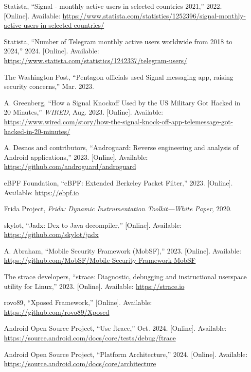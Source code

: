 \documentclass[a4paper,12pt]{report}
\begin{document}
\begin{thebibliography}{99}
Statista, “Signal - monthly active users in selected countries 2021,” 2022. [Online]. Available: \url{https://www.statista.com/statistics/1252396/signal-monthly-active-users-in-selected-countries/}

Statista, “Number of Telegram monthly active users worldwide from 2018 to 2024,” 2024. [Online]. Available: \url{https://www.statista.com/statistics/1242337/telegram-users/}

The Washington Post, “Pentagon officials used Signal messaging app, raising security concerns,” Mar. 2023.

A. Greenberg, “How a Signal Knockoff Used by the US Military Got Hacked in 20 Minutes,” \emph{WIRED}, Aug. 2023. [Online]. Available: \url{https://www.wired.com/story/how-the-signal-knock-off-app-telemessage-got-hacked-in-20-minutes/}

A. Desnos and contributors, “Androguard: Reverse engineering and analysis of Android applications,” 2023. [Online]. Available: \url{https://github.com/androguard/androguard}

eBPF Foundation, “eBPF: Extended Berkeley Packet Filter,” 2023. [Online]. Available: \url{https://ebpf.io}

Frida Project, \emph{Frida: Dynamic Instrumentation Toolkit—White Paper}, 2020.

skylot, “Jadx: Dex to Java decompiler,” [Online]. Available: \url{https://github.com/skylot/jadx}

A. Abraham, “Mobile Security Framework (MobSF),” 2023. [Online]. Available: \url{https://github.com/MobSF/Mobile-Security-Framework-MobSF}

The strace developers, “strace: Diagnostic, debugging and instructional userspace utility for Linux,” 2023. [Online]. Available: \url{https://strace.io}

rovo89, “Xposed Framework,” [Online]. Available: \url{https://github.com/rovo89/Xposed}

Android Open Source Project, “Use ftrace,” Oct. 2024. [Online]. Available: \url{https://source.android.com/docs/core/tests/debug/ftrace}

Android Open Source Project, “Platform Architecture,” 2024. [Online]. Available: \url{https://source.android.com/docs/core/architecture}


\end{thebibliography}
\end{document}
